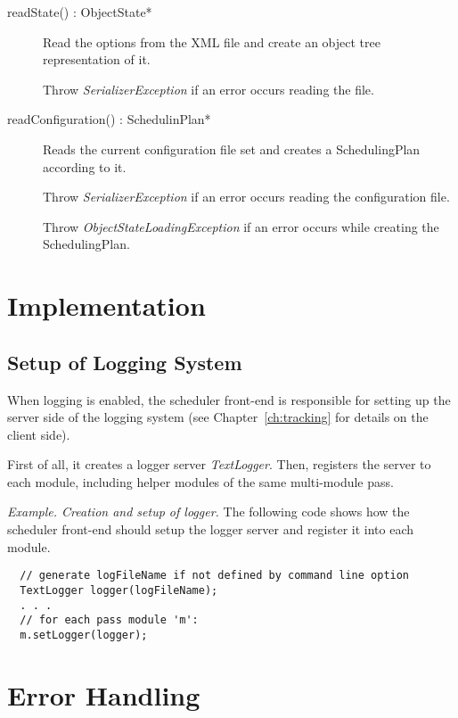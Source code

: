 \documentclass[a4paper,twoside]{tce}
\begin{document}
\begin{description}

\item[readState() : ObjectState*]
  Read the options from the XML file and create an object tree
  representation of it.

  Throw \emph{SerializerException} if an error occurs reading the
  file.

\item[readConfiguration() : SchedulinPlan*]
  Reads the current configuration file set and creates a
  SchedulingPlan according to it.

  Throw \emph{SerializerException} if an error occurs reading the
  configuration file.

  Throw \emph{ObjectStateLoadingException} if an error occurs while
  creating the SchedulingPlan.
\end{description}

\section{Implementation}

\subsection{Setup of Logging System}
\label{ssec:logging-imp}

When logging is enabled, the scheduler front-end is responsible for setting
up the server side of the logging system (see Chapter~\ref{ch:tracking} for
details on the client side).

First of all, it creates a logger server \emph{TextLogger}. Then, registers
the server to each module, including helper modules of the same multi-module
pass.

\emph{Example. Creation and setup of logger.} The following code shows how
the scheduler front-end should setup the logger server and register it into
each module.

\begin{verbatim}
  // generate logFileName if not defined by command line option
  TextLogger logger(logFileName);
  . . .
  // for each pass module 'm':
  m.setLogger(logger);
\end{verbatim}

\section{Error Handling}
\end{document}
